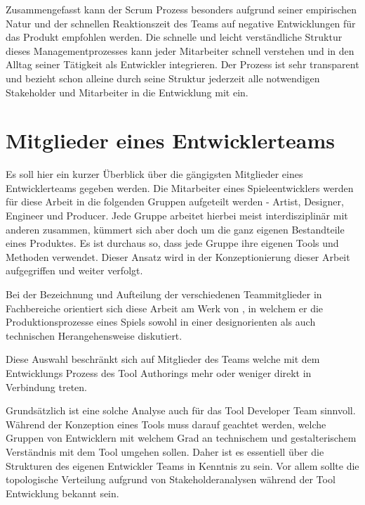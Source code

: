 \documentclass[pagesize, paper=a4, fontsize=12pt, titlepage=true, headings=small, headnosepline, abstractoff, liststotoc, nochapterprefix, plainheadsepline, twoside]{scrreprt}
\begin{document}
Zusammengefasst kann der Scrum Prozess besonders aufgrund seiner empirischen Natur und der schnellen Reaktionszeit des Teams auf negative Entwicklungen für das Produkt empfohlen werden. Die schnelle und leicht verständliche Struktur dieses Managementprozesses kann jeder Mitarbeiter schnell verstehen und in den Alltag seiner Tätigkeit als Entwickler integrieren. Der Prozess ist sehr transparent und bezieht schon alleine durch seine Struktur jederzeit alle notwendigen Stakeholder und Mitarbeiter in die Entwicklung mit ein.

\section{Mitglieder eines Entwicklerteams}
Es soll hier ein kurzer Überblick über die gängigsten Mitglieder eines Entwicklerteams gegeben werden. Die Mitarbeiter eines Spieleentwicklers werden für diese Arbeit in die folgenden Gruppen aufgeteilt werden - Artist, Designer, Engineer und Producer. Jede Gruppe arbeitet hierbei meist interdisziplinär mit anderen zusammen, kümmert sich aber doch um die ganz eigenen Bestandteile eines Produktes. Es ist durchaus so, dass jede Gruppe ihre eigenen Tools und Methoden verwendet. Dieser Ansatz wird in der Konzeptionierung dieser Arbeit aufgegriffen und weiter verfolgt.

Bei der Bezeichnung und Aufteilung der verschiedenen Teammitglieder in Fachbereiche orientiert sich diese Arbeit am Werk von , in welchem er die Produktionsprozesse eines Spiels sowohl in einer designorienten als auch technischen Herangehensweise diskutiert.

Diese Auswahl beschränkt sich auf Mitglieder des Teams welche mit dem Entwicklungs Prozess des Tool Authorings mehr oder weniger direkt in Verbindung treten.

Grundsätzlich ist eine solche Analyse auch für das Tool Developer Team sinnvoll. Während der Konzeption eines Tools muss darauf geachtet werden, welche Gruppen von Entwicklern mit welchem Grad an technischem und gestalterischem Verständnis mit dem Tool umgehen sollen. Daher ist es essentiell über die Strukturen des eigenen Entwickler Teams in Kenntnis zu sein. Vor allem sollte die topologische Verteilung aufgrund von Stakeholderanalysen während der Tool Entwicklung bekannt sein. 
\end{document}
